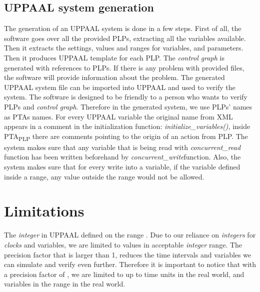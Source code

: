\subsection{UPPAAL system generation}
The generation of an UPPAAL system is done in a few steps. First of all, the software goes over all the provided PLPs, extracting all the variables available. Then it extracts the settings, values and ranges for variables, and parameters. Then it produces UPPAAL template for each PLP. The \textit{control graph} is generated with references to PLPs. If there is any problem with provided files, the software will provide information about the problem. The generated UPPAAL system file can be imported into UPPAAL and used to verify the system. The software is designed to be friendly to a person who wants to verify PLPs and \textit{control graph}. Therefore in the generated system, we use PLPs’ names as PTAs names. For every UPPAAL variable the original name from XML appears in a comment in the initialization function: \textcolor{ColorUppaalFunction}{\textit{initialize_variables()}}​, inside PTA\textsubscript{PLP} there are comments pointing to the origin of an action from PLP. The system makes sure that any variable that is being read with \textcolor{ColorUppaalFunction}{\textit{concurrent_read}} function has been written beforehand by \textcolor{ColorUppaalFunction}{\textit{concurrent_write}}​ function. Also, the system makes sure that for every write into a variable, if the variable defined inside a range, any value outside the range would not be allowed.\\
\section{Limitations}
The \textit{integer} in UPPAAL defined on the range \tmy{\left [ -32768, 32767 \right ]}{[-32768, 32767]}. Due to our reliance on \textit{integers} for \textit{clocks} and variables, we are limited to values in acceptable \textit{integer} range. The precision factor that is larger than 1, reduces the time intervals and variables we can simulate and verify even further. Therefore it is important to notice that with a precision factor of , we are limited to up to  time units in the real world, and variables in the range in the real world. \\
